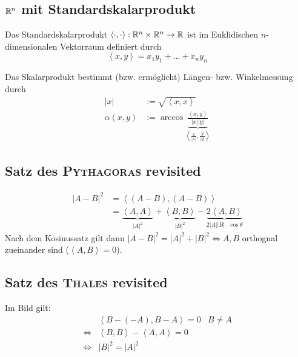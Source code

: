 
\subsection*{$\mathbb R^n$ mit Standardskalarprodukt} %

Das Standardskalarprodukt $\left\langle \cdot, \cdot \right\rangle: \mathbb R^n \times \mathbb R^n \to \mathbb R$ ist im
Euklidischen $n$-dimensionalen Vektorraum definiert durch
$$
	\left\langle x,y \right\rangle = x_1 y_1 + \dots + x_n y_n
$$

\begin{bem}
	Das Skalarprodukt bestimmt (bzw. ermöglicht) Längen- bzw. Winkelmessung durch
	\begin{align*}
		| x | & := \sqrt{\left\langle x,x \right\rangle}\\
		\alpha (x,y) & := \arccos \underbrace{\frac{\left\langle x,y \right\rangle}{| x | | y
		|}}_{\left\langle \frac{x}{| x |}, \frac{y}{|y|} \right\rangle}
	\end{align*}
\end{bem}


\subsection*{Satz des \textsc{Pythagoras} revisited} %
\label{sub:Satz des Pythagoras revisited}

\begin{align*}
	| A - B |^2 & = \left\langle (A-B), (A-B) \right\rangle\\
	& = \underbrace{\left\langle A,A \right\rangle}_{|A|^2} + \underbrace{\left\langle B,B
	\right\rangle}_{|B|^2} - \underbrace{2 \left\langle A,B \right\rangle}_{2 |A| |B| \cdot \cos
	\theta}
\end{align*}
Nach dem Kosinussatz gilt dann $|A - B|^2 = |A|^2 + |B|^2 \Leftrightarrow A,B$ orthognal zueinander
sind ($\left\langle A,B \right\rangle = 0$).


\subsection*{Satz des \textsc{Thales} revisited} %
\label{sub:Satz des Thales revisited}

Im Bild gilt:
\begin{align*}
	& \left\langle B-(-A), B-A \right\rangle = 0 & B \neq A\\
	\Leftrightarrow & \left\langle B,B \right\rangle - \left\langle A,A \right\rangle = 0\\
	\Leftrightarrow & |B|^2 = |A|^2
\end{align*}

\begin{center}
	
\end{center}

